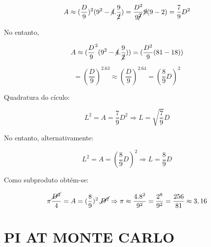 \documentclass[a4paper, 12pt]{article}
\begin{document}
    \begin{figure} [h!]
        \begin{minipage}[!] {0.5\linewidth}
            \caption{}
        \end{minipage}
        \begin{minipage}[!] {0.5\linewidth}
            \[A \approx (\frac{D}{9})^2(9^2 - \cancel{4}.\frac{9}{\cancel{2}}) = \frac{D^2}{9\cancel{^2}}\cancel{9}(9-2) = \frac{7}{9}D^2\]
        \end{minipage}
    \end{figure}
    
    No entanto, 
    
    \[A \approx (\frac{D}{9}^2 (9^2-\cancel{4}.\frac{9}{\cancel{2}})) = (\frac{D^2}{9} (81-18))\]
    
    \[= (\frac{D}{9})^2.63 \approx (\frac{D}{9})^2.64=(\frac{8}{9}D)^2\]
    
    Quadratura do cículo:
    
    \[L^2 = A = \frac{7}{9}D^2 \Rightarrow L = \sqrt{\frac{7}{9}}D\]
    
    No entanto, alternativamente: 
    
    \[L^2 = A = (\frac{8}{9}D)^2 \Rightarrow L=\frac{8}{9}D\]
    
    Como subproduto obtém-se:
    
    \[\pi \frac{\cancel{D^2}}{4} = A = (\frac{8}{9})^2.\cancel{D^2} \Rightarrow \pi \approx \frac{4.8^2}{9^2} = \frac{2^8}{9^2} = \frac{256}{81} \approx 3,16\]
    
    \newpage
\section{PI AT MONTE CARLO}
\end{document}
